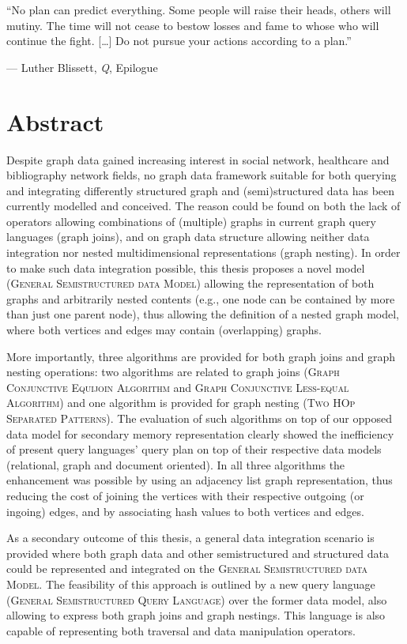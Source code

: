 \epigraph{``No plan can predict everything. Some people will raise their heads, others will mutiny. The time will not cease to bestow losses and fame to whose who will continue the fight. [\dots] Do not pursue your actions according to a plan.''}{--- Luther Blissett, \textit{Q}, Epilogue}

\chapter*{Abstract}
Despite  graph  data gained increasing interest in social network, healthcare and bibliography network fields, no graph data framework suitable for both querying and integrating differently structured graph and (semi)structured data has been currently modelled and conceived. The reason could be found on both the lack of operators allowing combinations of (multiple) graphs in current graph query languages (graph joins), and on graph data structure  allowing neither data integration nor nested multidimensional representations (graph nesting). In order to make such data integration possible, this thesis proposes a novel model (\textsc{General Semistructured data Model}) allowing the representation of both graphs and arbitrarily nested contents (e.g., one node can be contained by more than just one parent node), thus allowing the definition of a nested graph model, where both vertices and edges may contain (overlapping) graphs.

More importantly, three algorithms are provided for both graph joins and graph nesting operations: two algorithms are related to graph joins (\textsc{Graph Conjunctive Equijoin Algorithm} and \textsc{Graph Conjunctive Less-equal Algorithm}) and one algorithm is provided for graph nesting (\textsc{Two HOp Separated Patterns}). The evaluation of such algorithms on top of our opposed data model for secondary memory representation clearly showed the inefficiency of present query languages' query plan on top of their respective data models (relational, graph and document oriented). In all three algorithms the enhancement was possible by using an adjacency list graph representation, thus reducing the cost of joining the vertices with their respective outgoing (or ingoing) edges, and by associating hash values to both vertices and edges.

As a secondary outcome of this thesis, a general data integration scenario is provided where both graph data and other semistructured and structured data could be represented and integrated on the \textsc{General Semistructured data Model}. The feasibility of this approach is outlined by a new query language (\textsc{General Semistructured Query Language}) over the former data model, also allowing to express both graph joins and graph nestings. This language is also capable of representing both traversal and data manipulation operators.

